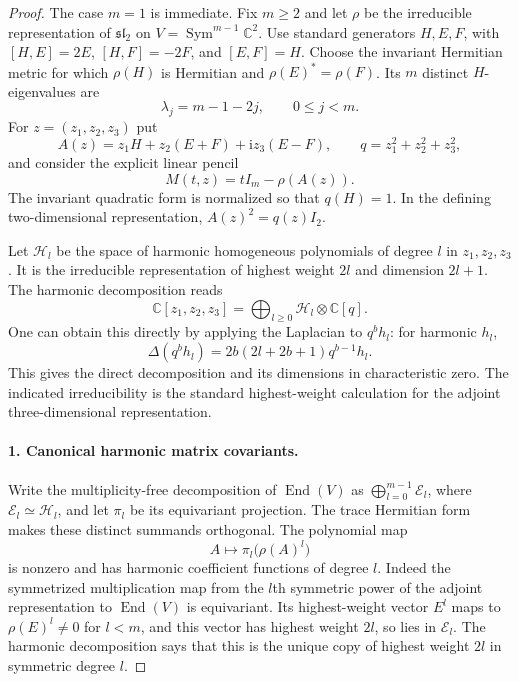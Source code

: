 \documentclass[11pt,a4paper]{article}
\theoremstyle{definition}\newtheorem{definition}{Definition}
\begin{document}
\begin{proof}
The case $m=1$ is immediate. Fix $m\geq2$ and let
$\rho$ be the irreducible representation of
$\mathfrak{sl}_2$ on $V=\operatorname{Sym}^{m-1}\mathbb C^2$.
Use standard generators $H,E,F$, with
$[H,E]=2E$, $[H,F]=-2F$, and $[E,F]=H$.
Choose the invariant Hermitian metric for which
$\rho(H)$ is Hermitian and $\rho(E)^*=\rho(F)$.
Its $m$ distinct $H$-eigenvalues are
\[
 \lambda_j=m-1-2j,\qquad 0\leq j<m.
\]
For $z=(z_1,z_2,z_3)$ put
\[
 A(z)=z_1H+z_2(E+F)+\mathrm i z_3(E-F),\qquad
 q=z_1^2+z_2^2+z_3^2,
\]
and consider the explicit linear pencil
\begin{equation}\label{G15:pencil}
 M(t,z)=tI_m-\rho(A(z)).
\end{equation}
The invariant quadratic form is normalized so that
$q(H)=1$. In the defining two-dimensional representation,
$A(z)^2=q(z)I_2$.

Let $\mathcal H_l$ be the space of harmonic homogeneous
polynomials of degree $l$ in $z_1,z_2,z_3$. It is the
irreducible representation of highest weight $2l$ and
dimension $2l+1$. The harmonic decomposition reads
\begin{equation}\label{G15:harmonic}
 \mathbb C[z_1,z_2,z_3]
     =\bigoplus_{l\geq0}\mathcal H_l\otimes\mathbb C[q].
\end{equation}
One can obtain this directly by applying the Laplacian to
$q^b h_l$: for harmonic $h_l$,
\[
 \Delta(q^b h_l)=2b(2l+2b+1)q^{b-1}h_l.
\]
This gives the direct decomposition and its dimensions in
characteristic zero. The indicated irreducibility is the
standard highest-weight calculation for the adjoint
three-dimensional representation.

\paragraph{1. Canonical harmonic matrix covariants.}
Write the multiplicity-free decomposition of
$\operatorname{End}(V)$ as
$\bigoplus_{l=0}^{m-1}\mathcal E_l$, where
$\mathcal E_l\simeq\mathcal H_l$, and let $\pi_l$ be its
equivariant projection. The trace Hermitian form makes
these distinct summands orthogonal. The polynomial map
\[
 A\longmapsto\pi_l\bigl(\rho(A)^l\bigr)
\]
is nonzero and has harmonic coefficient functions of
degree $l$. Indeed the symmetrized multiplication map
from the $l$th symmetric power of the adjoint
representation to $\operatorname{End}(V)$ is equivariant.
Its highest-weight vector $E^l$ maps to
$\rho(E)^l\ne0$ for $l<m$, and this vector has highest
weight $2l$, so lies in $\mathcal E_l$. The harmonic
decomposition says that this is the unique copy of
highest weight $2l$ in symmetric degree $l$.


\end{proof}
\end{document}
